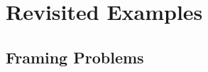 \documentclass{article}
\theoremstyle{plain}
\theoremstyle{definition}
\theoremstyle{remark}
\begin{document}

	
		
	\section{Revisited Examples}
	
	
	
	
	\subsection{Framing Problems}
	
\end{document}
